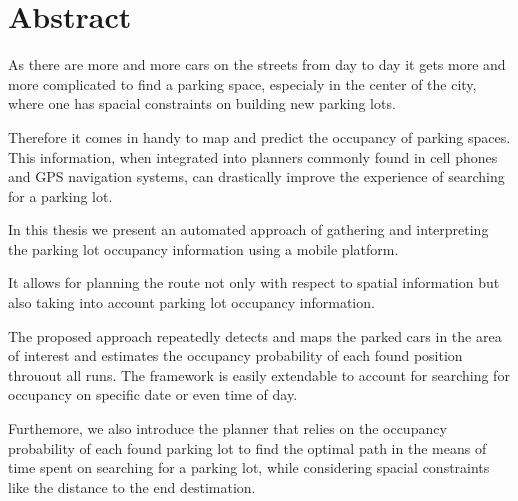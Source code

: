 \chapter{Abstract}
\label{cha:abstract}

As there are more and more cars on the streets from day to day it gets more and
more complicated to find a parking space, especialy in the center of the city,
where one has spacial constraints on building new parking lots. 

Therefore it comes in handy to map and predict the occupancy of parking spaces.
This information, when integrated into planners commonly found in cell phones
and GPS navigation systems, can drastically improve the experience of searching
for a parking lot.

In this thesis we present an automated approach of gathering and interpreting
the parking lot occupancy information using a mobile platform. 

It allows for planning the route not only
with respect to spatial information but also taking into account parking lot
occupancy information.

The proposed approach repeatedly detects and maps the parked cars in the area of interest
and estimates the occupancy probability of each found position throuout all runs. The framework
is easily extendable to account for searching for occupancy on specific date or
even time of day.

Furthemore, we also introduce the planner that relies on the occupancy
probability of each found parking lot to find the optimal path in the means of time spent on
searching for a parking lot, while considering spacial constraints like the
distance to the end destimation.



